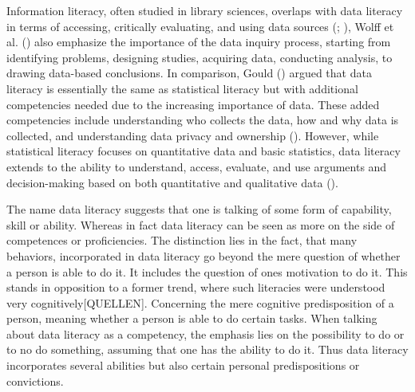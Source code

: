 \documentclass[
  12pt,
  a4paper,
  twoside]{article}
\begin{document}
Information literacy, often studied in library sciences, overlaps with data literacy in terms of accessing, critically evaluating, and using data sources (; ), Wolff et al. () also emphasize the importance of the data inquiry process, starting from identifying problems, designing studies, acquiring data, conducting analysis, to drawing data-based conclusions.
In comparison, Gould () argued that data literacy is essentially the same as statistical literacy but with additional competencies needed due to the increasing importance of data. These added competencies include understanding who collects the data, how and why data is collected, and understanding data privacy and ownership ().
However, while statistical literacy focuses on quantitative data and basic statistics, data literacy extends to the ability to understand, access, evaluate, and use arguments and decision-making based on both quantitative and qualitative data ().

The name data literacy suggests that one is talking of some form of capability, skill or ability. Whereas in fact data literacy can be seen as more on the side of competences or proficiencies. The distinction lies in the fact, that many behaviors, incorporated in data literacy go beyond the mere question of whether a person is able to do it. It includes the question of ones motivation to do it. This stands in opposition to a former trend, where such literacies were understood very cognitively{[}QUELLEN{]}. Concerning the mere cognitive predisposition of a person, meaning whether a person is able to do certain tasks. When talking about data literacy as a competency, the emphasis lies on the possibility to do or to no do something, assuming that one has the ability to do it. Thus data literacy incorporates several abilities but also certain personal predispositions or convictions.
\end{document}
